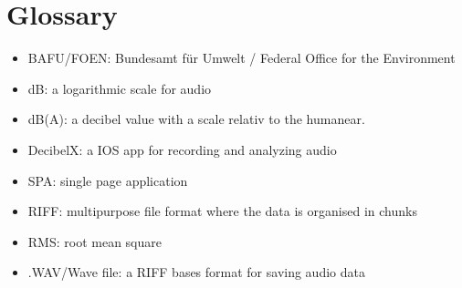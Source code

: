 \section{Glossary}
\begin{itemize}
    \item BAFU/FOEN: Bundesamt für Umwelt / Federal Office for the Environment 
    \item dB: a logarithmic scale for audio
    \item dB(A): a decibel value with a scale relativ to the humanear.
    \item DecibelX: a IOS app for recording and analyzing audio
    \item SPA: single page application
    \item RIFF: multipurpose file format where the data is organised in chunks
    \item RMS: root mean square
    \item .WAV/Wave file: a RIFF bases format for saving audio data
\end{itemize}

